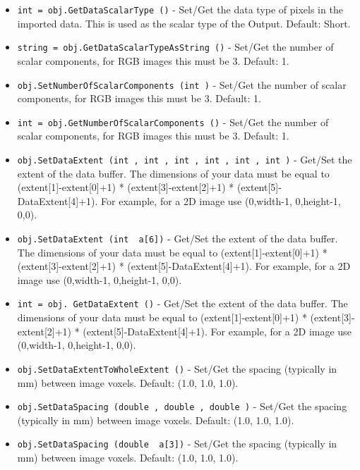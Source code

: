 \begin{itemize}
\item  \verb|int = obj.GetDataScalarType ()| -  Set/Get the data type of pixels in the imported data.  This is used
 as the scalar type of the Output.  Default: Short.

\item  \verb|string = obj.GetDataScalarTypeAsString ()| -  Set/Get the number of scalar components, for RGB images this must be 3.
 Default: 1.

\item  \verb|obj.SetNumberOfScalarComponents (int )| -  Set/Get the number of scalar components, for RGB images this must be 3.
 Default: 1.

\item  \verb|int = obj.GetNumberOfScalarComponents ()| -  Set/Get the number of scalar components, for RGB images this must be 3.
 Default: 1.

\item  \verb|obj.SetDataExtent (int , int , int , int , int , int )| -  Get/Set the extent of the data buffer.  The dimensions of your data
 must be equal to (extent[1]-extent[0]+1) * (extent[3]-extent[2]+1) * 
 (extent[5]-DataExtent[4]+1).  For example, for a 2D image use
 (0,width-1, 0,height-1, 0,0).

\item  \verb|obj.SetDataExtent (int  a[6])| -  Get/Set the extent of the data buffer.  The dimensions of your data
 must be equal to (extent[1]-extent[0]+1) * (extent[3]-extent[2]+1) * 
 (extent[5]-DataExtent[4]+1).  For example, for a 2D image use
 (0,width-1, 0,height-1, 0,0).

\item  \verb|int = obj. GetDataExtent ()| -  Get/Set the extent of the data buffer.  The dimensions of your data
 must be equal to (extent[1]-extent[0]+1) * (extent[3]-extent[2]+1) * 
 (extent[5]-DataExtent[4]+1).  For example, for a 2D image use
 (0,width-1, 0,height-1, 0,0).

\item  \verb|obj.SetDataExtentToWholeExtent ()| -  Set/Get the spacing (typically in mm) between image voxels.
 Default: (1.0, 1.0, 1.0).

\item  \verb|obj.SetDataSpacing (double , double , double )| -  Set/Get the spacing (typically in mm) between image voxels.
 Default: (1.0, 1.0, 1.0).

\item  \verb|obj.SetDataSpacing (double  a[3])| -  Set/Get the spacing (typically in mm) between image voxels.
 Default: (1.0, 1.0, 1.0).


\end{itemize}
